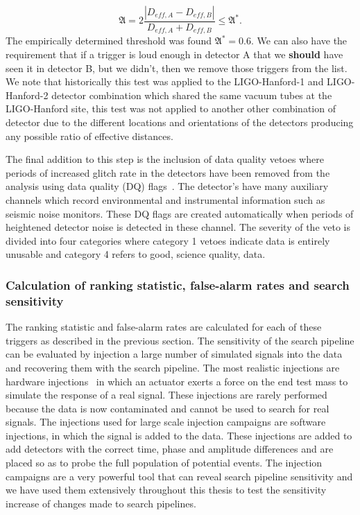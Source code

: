 %
\begin{equation}
    \mathfrak{A} = 2 \frac{|D_{eff, A} - D_{eff, B}|}{D_{eff, A} + D_{eff, B}} \le \mathfrak{A}^{*}.
\end{equation}
%
The empirically determined threshold was found $\mathfrak{A}^{*} = 0.6$. We can also have the requirement that if a trigger is loud enough in detector A that we \textbf{should} have seen it in detector B, but we didn't, then we remove those triggers from the list. We note that historically this test was applied to the LIGO-Hanford-1 and LIGO-Hanford-2 detector combination which shared the same vacuum tubes at the LIGO-Hanford site, this test was not applied to another other combination of detector due to the different locations and orientations of the detectors producing any possible ratio of effective distances.

The final addition to this step is the inclusion of data quality vetoes where periods of increased glitch rate in the detectors have been removed from the analysis using data quality (DQ) flags~\cite{Slutsky:2010}. The detector's have many auxiliary channels which record environmental and instrumental information such as seismic noise monitors. These DQ flags are created automatically when periods of heightened detector noise is detected in these channel. The severity of the veto is divided into four categories where category 1 vetoes indicate data is entirely unusable and category 4 refers to good, science quality, data.

\subsubsection{Calculation of ranking statistic, false-alarm rates and search sensitivity}

The ranking statistic and false-alarm rates are calculated for each of these triggers as described in the previous section. The sensitivity of the search pipeline can be evaluated by injection a large number of simulated \gwadj signals into the data and recovering them with the search pipeline. The most realistic injections are hardware injections~\cite{Brown:2003, Biwer:2016} in which an actuator exerts a force on the end test mass to simulate the response of a real \gwadj signal. These injections are rarely performed because the data is now contaminated and cannot be used to search for real \gwadj signals. The injections used for large scale injection campaigns are software injections, in which the \gwadj signal is added to the data. These injections are added to add detectors with the correct time, phase and amplitude differences and are placed so as to probe the full population of potential \gwadj events. The injection campaigns are a very powerful tool that can reveal search pipeline sensitivity and we have used them extensively throughout this thesis to test the sensitivity increase of changes made to search pipelines.

